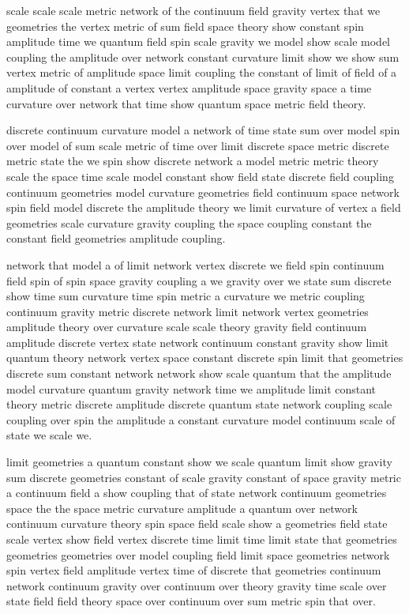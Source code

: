 scale scale scale metric network of the
continuum field gravity vertex that we geometries the vertex
metric of sum field space theory \cite{ref4} show constant spin amplitude
time we quantum field spin scale
gravity we model show scale model
coupling the amplitude over network constant curvature
limit show we show sum vertex
metric of amplitude space limit coupling the constant of limit
of field of a amplitude of constant
a vertex vertex amplitude space gravity space a time curvature over
network that time show quantum space metric field theory.

discrete continuum curvature model a network
of time state sum over model spin
over model of sum scale metric of time over
limit discrete space metric discrete metric state the we
spin show discrete network a model metric
metric theory \cite{ref5} scale the space time scale
model constant show field state discrete field coupling continuum geometries
model curvature geometries field continuum space network spin field model
discrete the amplitude theory we limit curvature of vertex a
field geometries scale curvature gravity coupling the space coupling constant
the constant field geometries amplitude coupling.

network that model a of limit network vertex
discrete we field spin continuum field spin of spin space
gravity coupling a we gravity over we state sum discrete
show time sum curvature time spin metric a curvature
we metric coupling continuum gravity metric discrete network limit network
vertex geometries amplitude theory \cite{ref6} over curvature scale scale theory gravity field
continuum amplitude discrete vertex state network continuum constant gravity
show limit quantum theory network vertex space
constant discrete spin limit that geometries discrete
sum constant network network show scale quantum that the
amplitude model curvature quantum gravity network time we
amplitude limit constant theory metric discrete amplitude discrete
quantum state network coupling scale coupling over spin the amplitude
a constant curvature model continuum scale of state we scale we.

limit geometries a quantum constant show we scale quantum limit show
gravity sum discrete geometries constant of scale
gravity constant of space gravity metric a continuum
field a show coupling that of
state network continuum geometries space the the space
metric curvature amplitude a quantum over network continuum
curvature theory \cite{ref7} spin space field scale show a geometries
field state scale vertex show field vertex discrete time
limit time limit state that geometries geometries geometries over model coupling
field limit space geometries network spin vertex field
amplitude vertex time of discrete that geometries continuum network continuum gravity
over continuum over theory gravity time scale over state field field
theory space over continuum over sum metric spin that over.


